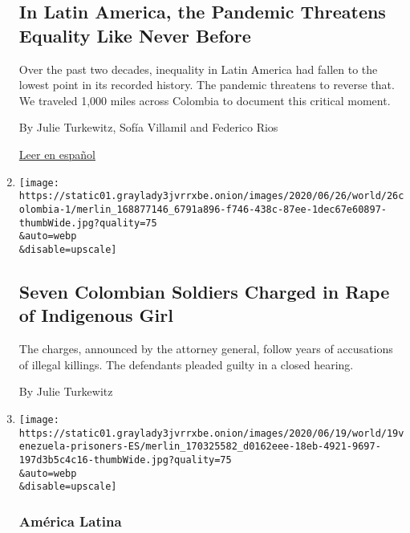 \begin{enumerate}
{  \subsection{In Latin America, the Pandemic Threatens Equality Like
  Never
  Before}\label{in-latin-america-the-pandemic-threatens-equality-like-never-before}}

  Over the past two decades, inequality in Latin America had fallen to
  the lowest point in its recorded history. The pandemic threatens to
  reverse that. We traveled 1,000 miles across Colombia to document this
  critical moment.

  By Julie Turkewitz, Sofía Villamil and Federico Rios

  \href{https://www.nytimes3xbfgragh.onion/es/2020/07/11/espanol/america-latina/desigualdad-coronavirus-america-latina-colombia.html}{Leer
  en español}
\item
  \href{/2020/06/26/world/americas/colombia-indigenous-girl-rape.html}{}

  \texttt{[image: https://static01.graylady3jvrrxbe.onion/images/2020/06/26/world/26colombia-1/merlin\_168877146\_6791a896-f746-438c-87ee-1dec67e60897-thumbWide.jpg?quality=75\\\&auto=webp\\\&disable=upscale]}

  \hypertarget{seven-colombian-soldiers-charged-in-rape-of-indigenous-girl}{%
  \subsection{Seven Colombian Soldiers Charged in Rape of Indigenous
  Girl}\label{seven-colombian-soldiers-charged-in-rape-of-indigenous-girl}}

  The charges, announced by the attorney general, follow years of
  accusations of illegal killings. The defendants pleaded guilty in a
  closed hearing.

  By Julie Turkewitz
\item
  \href{/es/2020/06/19/espanol/america-latina/desapariciones-forzadas-venezuela-informe-maduro.html}{}

  \texttt{[image: https://static01.graylady3jvrrxbe.onion/images/2020/06/19/world/19venezuela-prisoners-ES/merlin\_170325582\_d0162eee-18eb-4921-9697-197d3b5c4c16-thumbWide.jpg?quality=75\\\&auto=webp\\\&disable=upscale]}

  \hypertarget{amuxe9rica-latina}{%
  \subsubsection{América Latina}\label{amuxe9rica-latina}}


\end{enumerate}
